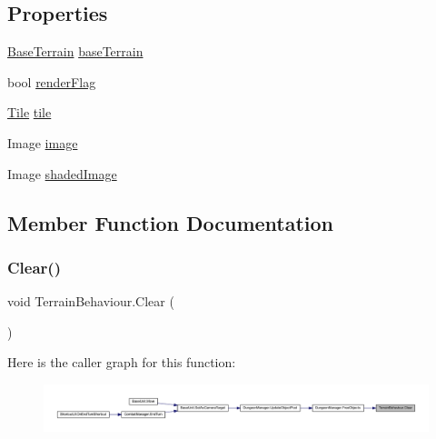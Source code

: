 \subsection*{Properties}
\begin{DoxyCompactItemize}
\item 
\mbox{\hyperlink{class_base_terrain}{Base\+Terrain}} \mbox{\hyperlink{class_terrain_behaviour_aeaebeaa90adc3c4b41853845a54a474e}{base\+Terrain}}
\item 
bool \mbox{\hyperlink{class_terrain_behaviour_ada11b3216887b92ca5f1de3e7165b4c2}{render\+Flag}}
\item 
\mbox{\hyperlink{class_tile}{Tile}} \mbox{\hyperlink{class_terrain_behaviour_a1c30fc3fee30bea9e90ee4acabcb5819}{tile}}
\item 
Image \mbox{\hyperlink{class_terrain_behaviour_a06f02f134baac6f02594037be9bf41d9}{image}}
\item 
Image \mbox{\hyperlink{class_terrain_behaviour_a91996bf69ee24b36099fa7a6b54aeaa5}{shaded\+Image}}
\end{DoxyCompactItemize}


\subsection{Member Function Documentation}
\mbox{\label{class_terrain_behaviour_a23ffdd00ac2a41293dff38496a09663d}} 
\subsubsection{\texorpdfstring{Clear()}{Clear()}}
{\footnotesize\ttfamily void Terrain\+Behaviour.\+Clear (\begin{DoxyParamCaption}{ }\end{DoxyParamCaption})}

Here is the caller graph for this function\+:
\nopagebreak
\begin{figure}[H]
\begin{center}
\leavevmode
\includegraphics[width=350pt]{class_terrain_behaviour_a23ffdd00ac2a41293dff38496a09663d_icgraph}
\end{center}
\end{figure}
\mbox{\label{class_terrain_behaviour_a81acf1d578876b7a0870fdb0880c52a9}} 

